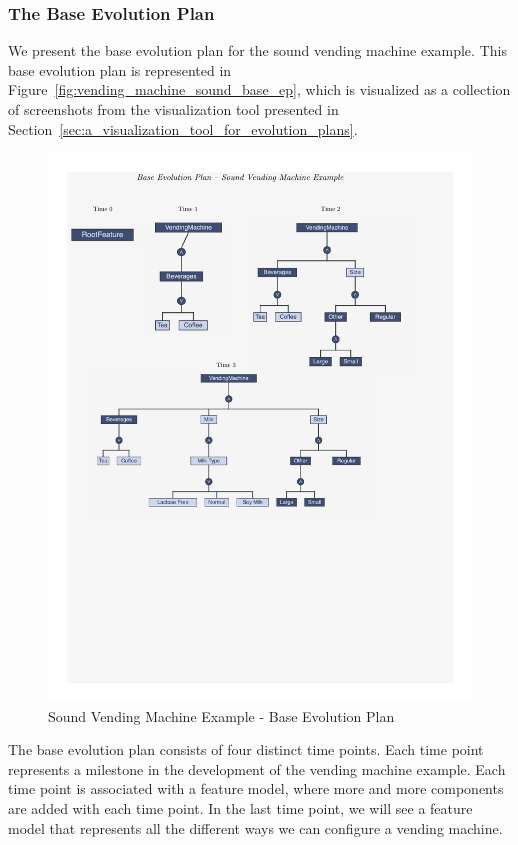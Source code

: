 \documentclass[a4paper,english]{ifimaster}
\begin{document}
\subsubsection{The Base Evolution Plan}%

We present the base evolution plan for the sound vending machine example. This base evolution plan is represented in Figure~\vref{fig:vending_machine_sound_base_ep}, which is visualized as a collection of screenshots from the visualization tool presented in Section~\vref{sec:a_visualization_tool_for_evolution_plans}.

\begin{figure}[htpb]
  \centering
  \includegraphics[width=\linewidth]{vending_machine/base_plan.pdf}
  \caption{Sound Vending Machine Example - Base Evolution Plan}%
  \label{fig:vending_machine_sound_base_ep}
\end{figure}

The base evolution plan consists of four distinct time points. Each time point represents a milestone in the development of the vending machine example. Each time point is associated with a feature model, where more and more components are added with each time point. In the last time point, we will see a feature model that represents all the different ways we can configure a vending machine.
\end{document}
